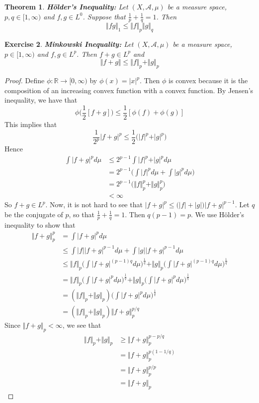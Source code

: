 \documentclass[12pt]{amsart}
\newtheorem{thm}{Theorem}[section]
\newtheorem{ex}[thm]{Exercise}
\newcommand{\R}{\mathbb{R}}
\newcommand{\MA}{\mathcal{A}}
\newcommand{\Rg}{[0,\infty)}
\newcommand{\n}{\Vert}
\begin{document}
\begin{thm}{\textbf{Hölder's Inequality:}}
Let $(X, \MA, \mu)$ be a measure space, $p,q \in [1, \infty)$ and $f,g \in L^0$. Suppose that $\frac{1}{p} + \frac{1}{q} = 1$. Then $$\n fg\n_1 \leq \n f \n_p \n g \n_q$$
\end{thm}

\begin{ex}\textbf{Minkowski Inequality:}
Let $(X, \MA, \mu)$ be a measure space, $p \in [1, \infty)$ and $f,g \in L^p$. Then $f+g \in L^p$ and $$\n f+g\n \leq \n f\n_p + \n g\n_p $$
\end{ex}

\begin{proof}
Define $\phi:\R \rightarrow \Rg$ by $\phi(x) = \vert x \vert^p$. Then $\phi$ is convex because it is the composition of an increasing convex function with a convex function. By Jensen's inequality, we have that $$\phi\bigg(\frac{1}{2}[f+g] \bigg) \leq \frac{1}{2}[\phi(f)+\phi(g)]$$ 
This implies that $$\frac{1}{2^p} \vert f+g\vert^p \leq \frac{1}{2}\bigg(\vert f\vert^p +\vert g \vert^p\bigg)$$ 
Hence 
\begin{align*}
\int\vert f + g\vert^p d \mu 
& \leq 2^{p-1}\int \vert f\vert^p +\vert g\vert^p d\mu \\
& = 2^{p-1}\bigg(\int \vert f\vert^p d\mu + \int \vert g\vert^p d\mu \bigg) \\
&= 2^{p-1}\bigg( \n f \n_p^p + \n g \n_p^p\bigg) \\
& < \infty
\end{align*}
So $f+g \in L^p$. Now, it is not hard to see that $|f+g|^p \leq \big( |f| + |g| \big)|f+g|^{p-1}$. Let $q$ be the conjugate of $p$, so that $\frac{1}{p} + \frac{1}{q} = 1$. Then $q(p-1) = p$. We use Hölder's inequality to show that 
\begin{align*}
\n f+g \n_p ^p
&= \int  |f+g|^p d \mu \\
& \leq \int |f| |f+g|^{p-1} d \mu + \int |g| |f+g|^{p-1} d \mu \\
& \leq \n f\n_p \bigg(\int |f+g|^{(p-1)q} d\mu\bigg)^{\frac{1}{q}} + \n g\n_p \bigg(\int |f+g|^{(p-1)q}d\mu\bigg)^{\frac{1}{q}} \\
&= \n f\n_p \bigg(\int |f+g|^{p} d\mu\bigg)^{\frac{1}{q}} + \n g\n_p \bigg(\int |f+g|^{p}d\mu\bigg)^{\frac{1}{q}} \\ 
&= (\n f\n_p + \n g \n_p) \bigg(\int |f+g|^{p} d\mu\bigg)^{\frac{1}{q}}\\
&= (\n f \n_p + \n g \n_p) \n f+g \n_p^{p/q}
\end{align*}
Since $\n f+g \n_p < \infty$, we see that
\begin{align*}
\n f \n_p + \n g \n_p 
& \geq \n f+g \n_p ^{p - p/q} \\
&=  \n f+g \n_p ^{p(1 - 1/q)} \\
&= \n f+g \n_p ^{p/p} \\
&= \n f+g \n_p
\end{align*}
\end{proof}
\end{document}
